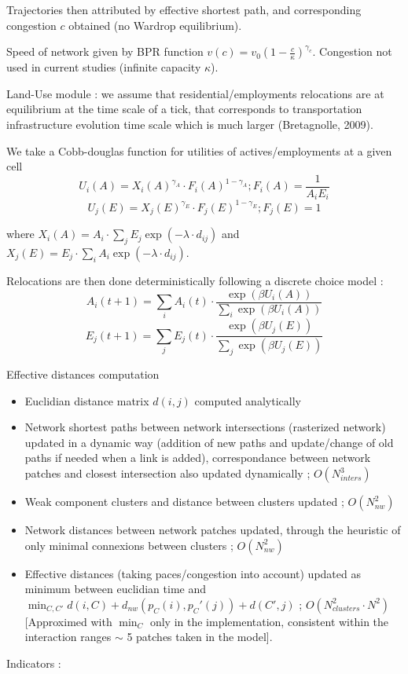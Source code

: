 Trajectories then attributed by effective shortest path, and corresponding congestion $c$ obtained (no Wardrop equilibrium). 

Speed of network given by BPR function $v(c) = v_0 \left(1 - \frac{c}{\kappa}\right)^{\gamma_c}$. Congestion not used in current studies (infinite capacity $\kappa$).



\bigskip
\bigskip

\newpage

Land-Use module : we assume that residential/employments relocations are at equilibrium at the time scale of a tick, that corresponds to transportation infrastructure evolution time scale which is much larger (Bretagnolle, 2009).

We take a Cobb-douglas function for utilities of actives/employments at a given cell
\[
U_i (A) = X_i(A)^{\gamma_A}\cdot {F_i(A)}^{1-\gamma_A} ; F_i(A) = \frac{1}{A_i E_i}
\]
\[
U_j (E) = X_j(E)^{\gamma_E}\cdot {F_j(E)}^{1-\gamma_E} ; F_j(E) = 1
\]

where $X_i(A) = A_i\cdot \sum_j{E_j \exp{\left(-\lambda\cdot d_{ij}\right)}}$ and $X_j(E) = E_j\cdot \sum_i{A_i \exp{\left(-\lambda\cdot d_{ij}\right)}}$.

Relocations are then done deterministically following a discrete choice model :
\[
A_i(t+1) = \sum_i{A_i(t)}\cdot\frac{\exp{(\beta U_i(A))}}{\sum_i{\exp{(\beta U_i(A))}}}
\]
\[
E_j(t+1) = \sum_j{E_j(t)}\cdot\frac{\exp{(\beta U_j(E))}}{\sum_j{\exp{(\beta U_j(E))}}}
\]




\newpage

Effective distances computation

\begin{itemize}
\item Euclidian distance matrix $d(i,j)$ computed analytically
\item Network shortest paths between network intersections (rasterized network) updated in a dynamic way (addition of new paths and update/change of old paths if needed when a link is added), correspondance between network patches and closest intersection also updated dynamically ; $O(N_{inters}^3)$
\item Weak component clusters and distance between clusters updated ; $O(N_{nw}^2)$
\item Network distances between network patches updated, through the heuristic of only minimal connexions between clusters ; $O(N_{nw}^2)$
\item Effective distances (taking paces/congestion into account) updated as minimum between euclidian time and $\min_{C,C'}{d(i,C)+d_{nw}(p_C(i),p_C'(j))+d(C',j)}$ ; $O(N_{clusters}^2\cdot N^2)$ [Approximed with $\min_C$ only in the implementation, consistent within the interaction ranges $\sim$ 5 patches taken in the model]. 
\end{itemize}





Indicators :










